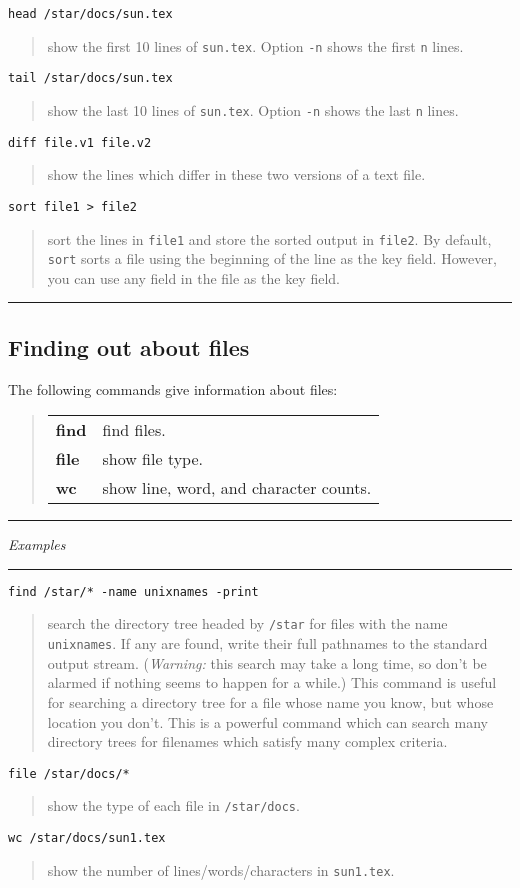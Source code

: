 \documentclass[twoside,11pt,nolof]{starlink}
\providecommand{\example}[2]{\goodbreak
                         \texttt{#1}
                         \vspace*{-4mm}
                         \begin{quote}
                           {\small #2}
                         \end{quote}
                        }
\providecommand{\exbegin}{\begin{center}
                      \rule{18mm}{0.3mm}
                      \emph{Examples}
                      \rule{18mm}{0.3mm}
                      \end{center}
                     }
\providecommand{\exend}{\begin{center}
                    \rule{50mm}{0.3mm}
                    \end{center}
                   }
\begin{document}
\example{head /star/docs/sun.tex}
{show the first 10 lines of \texttt{sun.tex}.
Option \texttt{-n} shows the first \texttt{n} lines.}

\example{tail /star/docs/sun.tex}
{show the last 10 lines of \texttt{sun.tex}.
Option \texttt{-n} shows the last \texttt{n} lines.}

\example{diff file.v1 file.v2}
{show the lines which differ in these two versions of a text file.}

\example{sort file1 > file2}
{sort the lines in \texttt{file1} and store the sorted output in \texttt{file2}.
By default, \texttt{sort} sorts a file using the beginning of the line as the
key field.
However, you can use any field in the file as the key field.}

\exend

\subsection{Finding out about files}

The following commands give information about files:

\begin{quote}
\begin{tabular}{lp{67mm}}

\textbf{find} & find files.\\
\textbf{file} & show file type.\\
\textbf{wc}   & show line, word, and character counts.

\end{tabular}
\end{quote}

\exbegin

\example{find /star/* -name unixnames -print}
{search the directory tree headed by \texttt{/star} for files with the name
\texttt{unixnames}.
If any are found, write their full pathnames to the standard output stream.
(\emph{Warning:}\/ this search may take a long time, so don't be alarmed if
nothing seems to happen for a while.)
This command is useful for searching a directory tree for a file whose
name you know, but whose location you don't.
This is a powerful command which can search many directory trees for filenames
which satisfy many complex criteria.}

\example{file /star/docs/*}
{show the type of each file in \texttt{/star/docs}.}

\example{wc /star/docs/sun1.tex}
{show the number of lines/words/characters in \texttt{sun1.tex}.}
\end{document}
